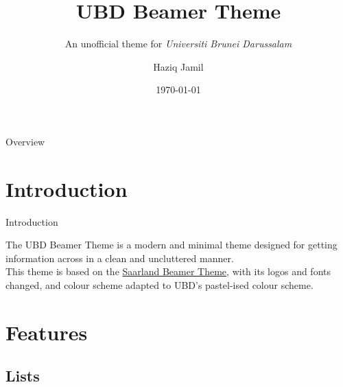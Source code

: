 \documentclass[]{beamer}
\author{Haziq Jamil}
\title{UBD Beamer Theme}
\subtitle{An unofficial theme for \textit{Universiti Brunei Darussalam}}
\institute{Mathematical Sciences, Faculty of Science, UBD\\ \url{https://haziqj.ml}}
\date{\today}
\begin{document}
\begin{frame}
	\titlepage
\end{frame}

\begin{frame}{Overview}
	\tableofcontents
\end{frame}

\section{Introduction}

\begin{frame}{Introduction}

	The UBD Beamer Theme is a modern and minimal theme designed for getting information across in a clean and uncluttered manner.\\[1em]
	
	This theme is based on the \href{https://github.com/kailashbuki/beamerthemesaarland}{Saarland Beamer Theme}, with its logos and fonts changed, and colour scheme adapted to UBD's pastel-ised colour scheme.
	
\end{frame}

\section{Features}
	
\subsection{Lists}
\end{document}
